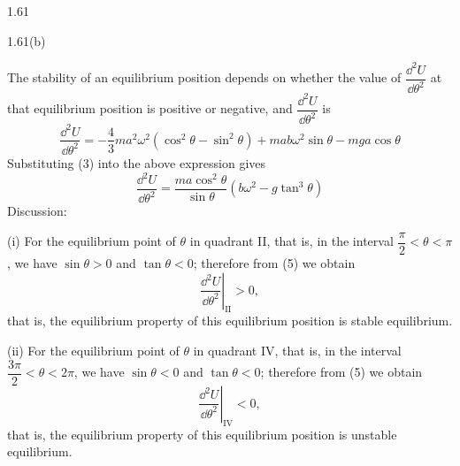 \begin{solution}{1.61}
\begin{figbox}{1.61(b)}
\end{figbox}

The stability of an equilibrium position depends on whether the value of $\dfrac{\dd^2U}{\dd\theta^2}$ at that equilibrium position is positive or negative, and $\dfrac{\dd^2U}{\dd\theta^2}$ is
\begin{equation}
\frac{\dd^2U}{\dd\theta^2}=-\frac{4}{3}ma^2\omega^2\left(\cos^2\theta-\sin^2\theta\right)+mab\omega^2\sin\theta-mga\cos\theta \tag{4}
\end{equation}
Substituting (3) into the above expression gives
\begin{equation}
\frac{\dd^2U}{\dd\theta^2}=\frac{ma\cos^2\theta}{\sin\theta}\left(b\omega^2-g\tan^3\theta\right) \tag{5}
\end{equation}
Discussion:

(i) For the equilibrium point of $\theta$ in quadrant II, that is, in the interval $\dfrac{\pi}{2}<\theta<\pi$, we have $\sin\theta>0$ and $\tan\theta<0$; therefore from (5) we obtain
\[
\left.\frac{\dd^2U}{\dd\theta^2}\right|_{\text{II}}>0,
\]
that is, the equilibrium property of this equilibrium position is stable equilibrium.

(ii) For the equilibrium point of $\theta$ in quadrant IV, that is, in the interval $\dfrac{3\pi}{2}<\theta<2\pi$, we have $\sin\theta<0$ and $\tan\theta<0$; therefore from (5) we obtain
\[
\left.\frac{\dd^2U}{\dd\theta^2}\right|_{\text{IV}}<0,
\]
that is, the equilibrium property of this equilibrium position is unstable equilibrium.


\end{solution}
